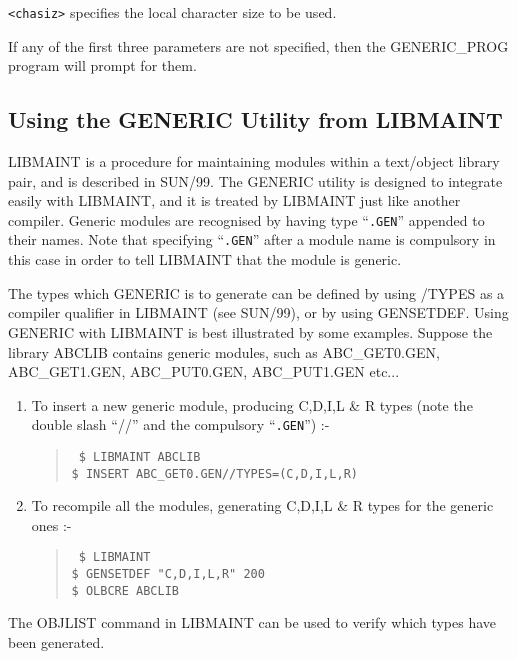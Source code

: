 \verb+<chasiz>+ specifies the local character size to be used.

If any of the first three parameters are not specified,
then the GENERIC\_PROG program will prompt for them.

\subsection{Using the GENERIC Utility from LIBMAINT}

LIBMAINT is a procedure for maintaining modules within a text/object
library pair, and is described in SUN/99.
The GENERIC utility is designed to integrate easily with LIBMAINT,
and it is treated by LIBMAINT just like another compiler.
Generic modules are recognised by having type ``{\tt .GEN}''
appended to their names.
Note that specifying ``{\tt .GEN}'' after a module name is compulsory
in this case in order to tell LIBMAINT that the module is
generic.

The types which GENERIC is to generate can be defined by using /TYPES
as a compiler qualifier in LIBMAINT (see SUN/99), or by using GENSETDEF.
Using GENERIC with LIBMAINT is best illustrated by some examples.
Suppose the library ABCLIB contains generic modules, such as
ABC\_GET0.GEN, ABC\_GET1.GEN, ABC\_PUT0.GEN, ABC\_PUT1.GEN etc...

\begin{enumerate}

\item To insert a new generic module, producing C,D,I,L \& R types
(note the double slash ``//'' and the compulsory ``{\tt .GEN}'') :-

\begin{quote}{\tt
\$ LIBMAINT ABCLIB \\
\$ INSERT ABC\_GET0.GEN//TYPES=(C,D,I,L,R)
}
\end{quote}


\item To recompile all the modules, generating C,D,I,L \& R types for
the generic ones :-

\begin{quote}{\tt
\$ LIBMAINT \\
\$ GENSETDEF "C,D,I,L,R" 200 \\
\$ OLBCRE ABCLIB
}
\end{quote}

\end{enumerate}
The OBJLIST command in LIBMAINT can be used to verify which types
have been generated.

